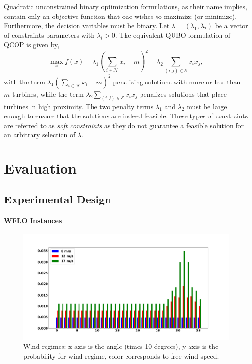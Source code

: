 \documentclass[preprint,12pt]{elsarticle}
\begin{document}
Quadratic unconstrained binary optimization formulations, as their name implies, contain only an objective function that 
one wishes to maximize (or minimize). Furthermore, the decision variables must be binary. Let $\lambda = (\lambda_1,\lambda_2)$ 
be a vector of constraints parameters with $\lambda_i >0$. The equivalent QUBO formulation of QCOP is given by,
\begin{equation}\max_{x}^{} f(x) - \lambda_1 (\sum_{i \in \mathcal{N}}^{} x_i -m) ^2 - \lambda_2 \sum_{(i,j) \in \mathcal{E}}^{} x_i x_j , \label{QUBO}\end{equation}
with the term $ \lambda_1 (\sum_{i \in \mathcal{N}}^{} x_i -m) ^2$ 
penalizing solutions with more or less than $m$ turbines, while the term $\lambda_2 \sum_{(i,j) \in \mathcal{E}}^{} x_i x_j$ penalizes
solutions that place turbines in high proximity. The two penalty terms $\lambda_1$ and $\lambda_2$ 
must be large enough to ensure that the solutions are indeed feasible. These types of constraints
are referred to as \emph{soft constraints} as they do not guarantee a feasible solution 
for an arbitrary selection of $\lambda$.   

\section{Evaluation}
\label{sec:eval}


\subsection{Experimental Design}



\paragraph{WFLO Instances}
\begin{figure}[t]
	\centering
	\includegraphics[scale = 0.3]{prob_wind_pdf.pdf}
	
	\caption{Wind regimes: x-axis is the angle (times 10 degrees), y-axis is the probability for wind regime, color corresponds to free wind speed.}\label{fig:prob_wind}
\end{figure}
\end{document}
